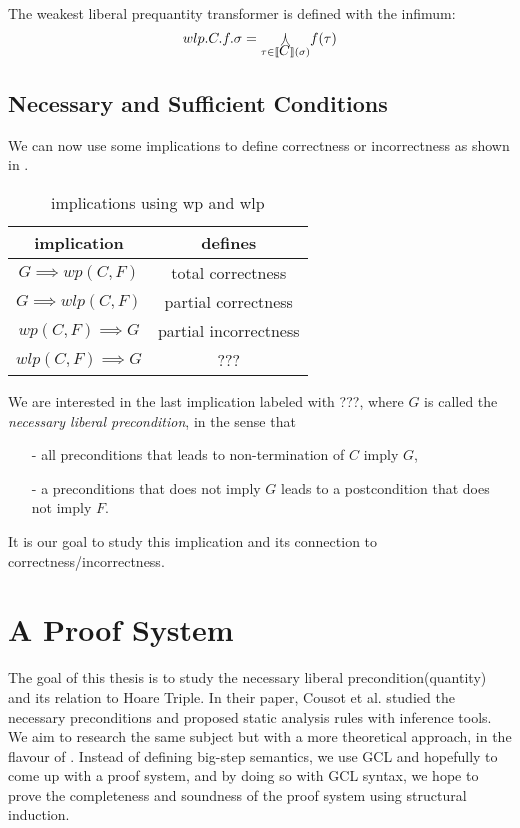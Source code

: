 \documentclass[adraft,hidelinks]{eptcs}
\begin{document}
The weakest liberal prequantity transformer is defined with the infimum: 
\[wlp.C.f.\sigma = \underset{\tau\in\bkt C(\sigma)}{\bigjoin} f(\tau)\]

\subsection{Necessary and Sufficient Conditions}
We can now use some implications to define correctness or incorrectness as shown in . 
\begin{table}\centering 
    \begin{tabular}{cc}
      \textbf{implication}&\textbf{defines}    \\ \hline
      $G\implies wp(C,F)$&   total correctness   \\
      $G\implies wlp(C,F)$&  partial correctness\\
      $wp(C,F)\implies G$&  partial incorrectness\\
      $wlp(C,F)\implies G$&  ???\\
    \end{tabular}
    \caption{implications using wp and wlp\cite{Zhang2022}}
    \label{tab:impl}
\end{table}    

We are interested in the last implication labeled with ???, where $G$ is called the \textit{necessary liberal precondition}, in the sense that 
\begin{itemize}
    \item [-] all preconditions that leads to non-termination of $C$ imply $G$, 
    \item [-] a preconditions that does not imply $G$ leads to a postcondition that does not imply $F$. 
\end{itemize}
It is our goal to study this implication and its connection to correctness/incorrectness. 


\section{A Proof System}
The goal of this thesis is to study the necessary liberal precondition(quantity) and its relation to Hoare Triple. 
In their paper, Cousot et al. studied the necessary preconditions and proposed static analysis rules with inference tools. 
We aim to research the same subject but with a more theoretical approach, in the flavour of \cite{Vries2011}. 
Instead of defining big-step semantics, we use GCL and hopefully to come up with a proof system, 
and by doing so with GCL syntax, we hope to prove the completeness and soundness of the proof system using structural induction. 








\end{document}
